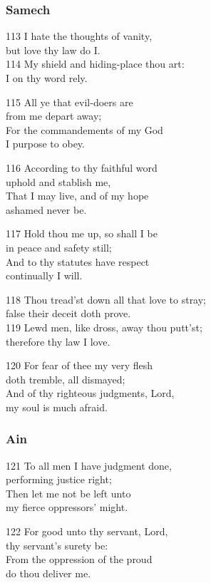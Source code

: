 \begin{multicols}{3}
\subsubsection*{Samech}

113 I hate the thoughts of vanity,\\
but love thy law do I.\\
114 My shield and hiding-place thou art:\\
I on thy word rely.

115 All ye that evil-doers are\\
from me depart away;\\
For the commandements of my God\\
I purpose to obey.

116 According to thy faithful word\\
uphold and stablish me,\\
That I may live, and of my hope\\
ashamed never be.

117 Hold thou me up, so shall I be\\
in peace and safety still;\\
And to thy statutes have respect\\
continually I will.

118 Thou tread’st down all that love to stray;\\
false their deceit doth prove.\\
119 Lewd men, like dross, away thou putt’st;\\
therefore thy law I love.

120 For fear of thee my very flesh\\
doth tremble, all dismayed;\\
And of thy righteous judgments, Lord,\\
my soul is much afraid.

\subsubsection*{Ain}

121 To all men I have judgment done,\\
performing justice right;\\
Then let me not be left unto\\
my fierce oppressors’ might.

122 For good unto thy servant, Lord,\\
thy servant’s surety be:\\
From the oppression of the proud\\
do thou deliver me.


\end{multicols}
